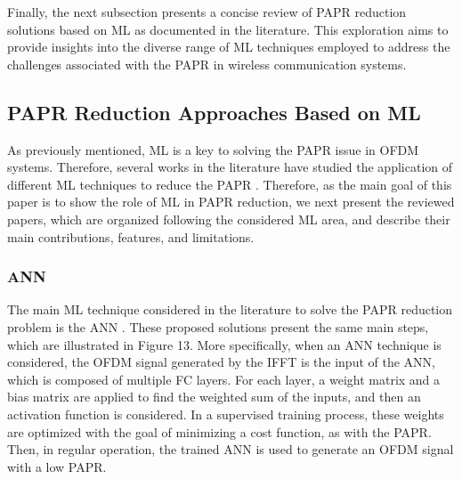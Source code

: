\documentclass[conference]{IEEEtran}
\begin{document}
Finally, the next subsection presents a concise review of PAPR reduction solutions based on ML as documented in the literature. This exploration aims to provide insights into the diverse range of ML techniques employed to address the challenges associated with the PAPR in wireless communication systems.

\subsection{PAPR Reduction Approaches Based on ML}
As previously mentioned, ML is a key to solving the PAPR issue in OFDM systems. Therefore, several works in the literature have studied the application of different ML techniques to reduce the PAPR \cite{b134, b135, b141, b142, b143, b144, b145, b146, b147, b148, b149, b150, b151, b152, b153, b154, b155}. Therefore, as the main goal of this paper is to show the role of ML in PAPR reduction, we next present the reviewed papers, which are organized following the considered ML area, and describe their main contributions, features, and limitations.

\subsubsection{ANN \cite{b135, b141, b142, b143, b144, b145, b146}}
The main ML technique considered in the literature to solve the PAPR reduction problem is the ANN \cite{b135, b141, b142, b143, b144, b145, b146}. These proposed solutions present the same main steps, which are illustrated in Figure 13. More specifically, when an ANN technique is considered, the OFDM signal generated by the IFFT is the input of the ANN, which is composed of multiple FC layers. For each layer, a weight matrix and a bias matrix are applied to find the weighted sum of the inputs, and then an activation function is considered. In a supervised training process, these weights are optimized with the goal of minimizing a cost function, as with the PAPR. Then, in regular operation, the trained ANN is used to generate an OFDM signal with a low PAPR.
\end{document}
